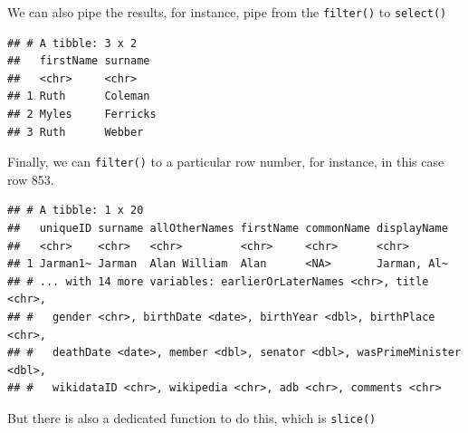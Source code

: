 \documentclass[
]{book}
\newenvironment{Shaded}{\begin{snugshade}}{\end{snugshade}}
\newcommand{\DecValTok}[1]{\textcolor[rgb]{0.00,0.00,0.81}{#1}}
\newcommand{\KeywordTok}[1]{\textcolor[rgb]{0.13,0.29,0.53}{\textbf{#1}}}
\newcommand{\NormalTok}[1]{#1}
\newcommand{\OperatorTok}[1]{\textcolor[rgb]{0.81,0.36,0.00}{\textbf{#1}}}
\newcommand{\StringTok}[1]{\textcolor[rgb]{0.31,0.60,0.02}{#1}}
\begin{document}
We can also pipe the results, for instance, pipe from the \texttt{filter()} to \texttt{select()}

\begin{Shaded}
\end{Shaded}

\begin{verbatim}
## # A tibble: 3 x 2
##   firstName surname 
##   <chr>     <chr>   
## 1 Ruth      Coleman 
## 2 Myles     Ferricks
## 3 Ruth      Webber
\end{verbatim}

Finally, we can \texttt{filter()} to a particular row number, for instance, in this case row 853.

\begin{Shaded}
\end{Shaded}

\begin{verbatim}
## # A tibble: 1 x 20
##   uniqueID surname allOtherNames firstName commonName displayName
##   <chr>    <chr>   <chr>         <chr>     <chr>      <chr>      
## 1 Jarman1~ Jarman  Alan William  Alan      <NA>       Jarman, Al~
## # ... with 14 more variables: earlierOrLaterNames <chr>, title <chr>,
## #   gender <chr>, birthDate <date>, birthYear <dbl>, birthPlace <chr>,
## #   deathDate <date>, member <dbl>, senator <dbl>, wasPrimeMinister <dbl>,
## #   wikidataID <chr>, wikipedia <chr>, adb <chr>, comments <chr>
\end{verbatim}

But there is also a dedicated function to do this, which is \texttt{slice()}

\begin{Shaded}
\end{Shaded}
\end{document}
